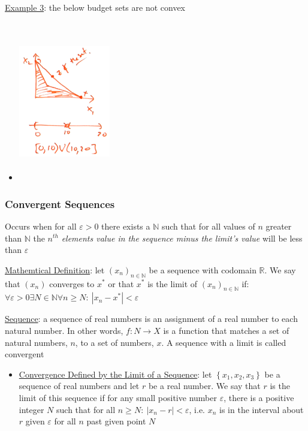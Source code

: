 \documentclass{article}
\begin{document}
  \par
  \underline{Example 3}: the below budget sets are not convex
  \begin{itemize}
    \item  \includegraphics[width=4cm, height=7cm]{pic15}
  \end{itemize}
  \par
\vspace{6mm}
\subsubsection{Convergent Sequences}
Occurs when for all $\varepsilon > 0$ there exists a $\mathbb{N}$ such that for all values of $n$ greater than $\mathbb{N}$ the $n^{th}$ \textit{elements value in the sequence minus the limit's value} will be less than $\varepsilon$ \par \vspace{0.3em}
  \underline{Mathemtical Definition}: let $(x_{n})_{n \in \mathbb{N}}$ be a sequence with codomain $\mathbb{R}$. We say that $(x_{n})$ converges to $x^{*}$ or that $x^{*}$ is the limit of $(x_{n})_{n \in \mathbb{N}}$ if: $\forall \varepsilon > 0 \exists N \in \mathbb{N} \forall n \geq N: \ |x_{n} - x^{*}| < \varepsilon$ \par
  \underline{Sequence}: a sequence of real numbers is an assignment of a real number to each natural number. In other words, $f: N \rightarrow X$ is a function that matches a set of natural numbers, $n$, to a set of numbers, $x$. A sequence with a limit is called convergent
  \begin{itemize}
    \item  \underline{Convergence Defined by the Limit of a Sequence}: let $\left\{ x_{1}, x_{2}, x_{3} \right\}$  be a sequence of real numbers and let $r$ be a real number. We say that $r$ is the limit of this sequence if for any small positive number $\varepsilon$, there is a positive integer $N$ such that for all $n \geq N: \ |x_{n} - r| < \varepsilon$, i.e. $x_{n}$ is in the interval about $r$ given $\varepsilon$ for all $n$ past given point $N$
  \end{itemize}
  \par
\vspace{6mm}
\end{document}
